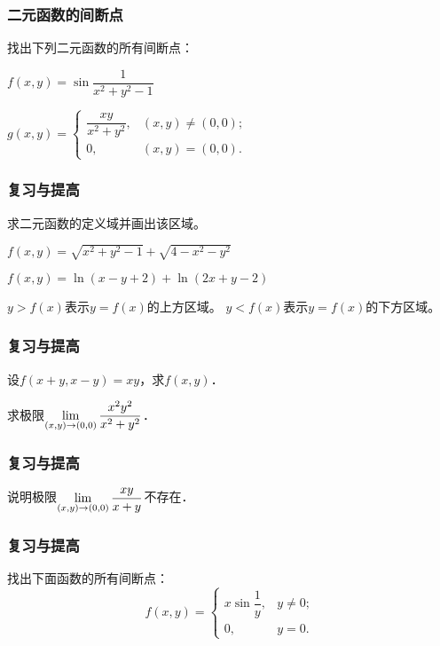 \documentclass[14pt,notheorems,leqno,xcolor={rgb}]{beamer} %
\begin{document}
\begin{frame}
\frametitle{二元函数的间断点}
\begin{example}
找出下列二元函数的所有间断点：
\begin{enumlite}
  \item $f(x,y)=\sin\dfrac1{x^2+y^2-1}$
  \item $g(x,y)=\begin{cases}
       \dfrac{xy}{x^2+y^2}, & (x,y)\neq(0,0); \\ 0, & (x,y)=(0,0).
       \end{cases}$
\end{enumlite}
\end{example}
\end{frame}


\begin{frame}
\frametitle{复习与提高}
\begin{review}
求二元函数的定义域并画出该区域。
\begin{enumlite}
  \item $f(x,y)=\sqrt{x^2+y^2-1}+\sqrt{4-x^2-y^2}$
  \item $f(x,y)=\ln(x-y+2)+\ln(2x+y-2)$
\end{enumlite}
\end{review}
\vpause
\begin{remark*}
\parbox[t]{0.8\textwidth}{%
$y>f(x)$表示$y=f(x)$的上方区域。\newline
$y<f(x)$表示$y=f(x)$的下方区域。}
\end{remark*}
\end{frame}

\begin{frame}
\frametitle{复习与提高}
\begin{puzzle}
设$f(x+y,x-y)=xy$，求$f(x,y)$．
\end{puzzle}
\vpause
\begin{puzzle}
求极限$\lim\limits_{(x,y)\to(0,0)}\dfrac{x^2y^2}{x^2+y^2}$．
\end{puzzle}
\end{frame}

\begin{frame}
\frametitle{复习与提高}
\begin{puzzle}
说明极限$\lim\limits_{(x,y)\to(0,0)}\dfrac{xy}{x+y}$不存在．
\end{puzzle}
\end{frame}

\begin{frame}
\frametitle{复习与提高}
\begin{puzzle}
找出下面函数的所有间断点：
$$f(x,y)=\begin{cases}
x\sin\dfrac{1}{y}, & y \neq 0; \\ 0, & y=0.
\end{cases}$$
\end{puzzle}
\end{frame}
\end{document}
